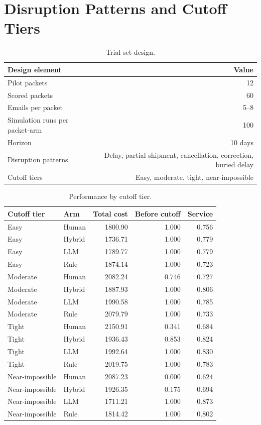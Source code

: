 \documentclass[11pt]{article}
\begin{document}
\section{Disruption Patterns and Cutoff Tiers}

\begin{table}[H]
\centering
\caption{Trial-set design.}
\small
\begin{tabular}{lr}
\toprule
Design element & Value \\
\midrule
Pilot packets & 12 \\
Scored packets & 60 \\
Emails per packet & 5--8 \\
Simulation runs per packet-arm & 100 \\
Horizon & 10 days \\
Disruption patterns & Delay, partial shipment, cancellation, correction, buried delay \\
Cutoff tiers & Easy, moderate, tight, near-impossible \\
\bottomrule
\end{tabular}
\end{table}

\begin{table}[H]
\centering
\caption{Performance by cutoff tier.}
\small
\begin{tabular}{llrrr}
\toprule
Cutoff tier & Arm & Total cost & Before cutoff & Service \\
\midrule
Easy & Human & 1800.90 & 1.000 & 0.756 \\
Easy & Hybrid & 1736.71 & 1.000 & 0.779 \\
Easy & LLM & 1789.77 & 1.000 & 0.779 \\
Easy & Rule & 1874.14 & 1.000 & 0.723 \\
Moderate & Human & 2082.24 & 0.746 & 0.727 \\
Moderate & Hybrid & 1887.93 & 1.000 & 0.806 \\
Moderate & LLM & 1990.58 & 1.000 & 0.785 \\
Moderate & Rule & 2079.79 & 1.000 & 0.733 \\
Tight & Human & 2150.91 & 0.341 & 0.684 \\
Tight & Hybrid & 1936.43 & 0.853 & 0.824 \\
Tight & LLM & 1992.64 & 1.000 & 0.830 \\
Tight & Rule & 2019.75 & 1.000 & 0.783 \\
Near-impossible & Human & 2087.23 & 0.000 & 0.624 \\
Near-impossible & Hybrid & 1926.35 & 0.175 & 0.694 \\
Near-impossible & LLM & 1711.21 & 1.000 & 0.873 \\
Near-impossible & Rule & 1814.42 & 1.000 & 0.802 \\
\bottomrule
\end{tabular}
\end{table}
\end{document}
